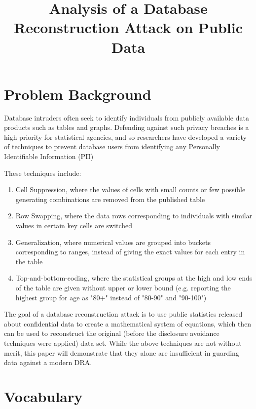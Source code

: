 \documentclass[jou,apacite]{apa6}
\title{Analysis of a Database Reconstruction Attack on Public Data}
\begin{document}
\maketitle

\section{Problem Background}
Database intruders often seek to identify individuals from publicly
available data products such as tables and graphs.
Defending against such privacy breaches is
a high priority for statistical agencies, and so researchers
have developed a variety of techniques to prevent database users
from identifying any Personally Identifiable Information (PII)

These techniques include:
\begin{enumerate}
  \item Cell Suppression, where the values of cells with small counts or few possible
        generating combinations are removed from the published table
  \item Row Swapping, where the data rows corresponding to individuals
        with similar values in certain key cells are switched
  \item Generalization, where numerical values are grouped into
        buckets corresponding to ranges, instead of giving the exact
        values for each entry in the table
  \item Top-and-bottom-coding, where the statistical groups at the high and low ends
        of the table are given without upper or lower bound (e.g.
        reporting the highest group for age as "80+" instead of
        "80-90" and "90-100")
\end{enumerate}

The goal of a database reconstruction attack is to
use public statistics released about confidential data to create a mathematical system of equations,
which then can be used to reconstruct the original (before the disclosure
avoidance techniques were applied) data set.
While the above techniques are not without merit, this paper will
demonstrate that they alone are insufficient in guarding data against
a modern DRA.

\section{Vocabulary}
\end{document}
